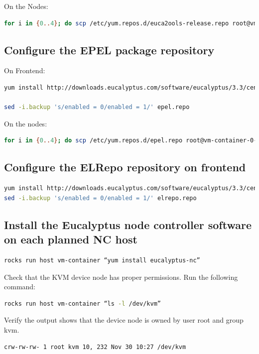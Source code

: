 On the Nodes:
\begin{lstlisting}[language=bash]
for i in {0..4}; do scp /etc/yum.repos.d/euca2ools-release.repo root@vm-container-0-$i:/etc/yum.repos.d/euca2ools-release.repo ; done
\end{lstlisting}

\subsection{Configure the EPEL package repository}
On Frontend:
\begin{lstlisting}[language=bash]
yum install http://downloads.eucalyptus.com/software/eucalyptus/3.3/centos/6/x86_64/epel-release-6.noarch.rpm

sed -i.backup 's/enabled = 0/enabled = 1/' epel.repo
\end{lstlisting}

On the nodes:
\begin{lstlisting}[language=bash]
for i in {0..4}; do scp /etc/yum.repos.d/epel.repo root@vm-container-0-$i:/etc/yum.repos.d/epel.repo ; done
\end{lstlisting}

\subsection{Configure the ELRepo repository on frontend}
\begin{lstlisting}[language=bash]
yum install http://downloads.eucalyptus.com/software/eucalyptus/3.3/centos/6/x86_64/elrepo-release-6.noarch.rpm
sed -i.backup 's/enabled = 0/enabled = 1/' elrepo.repo
\end{lstlisting}

\subsection{Install the Eucalyptus node controller software on each planned NC host}
\begin{lstlisting}[language=bash]
rocks run host vm-container “yum install eucalyptus-nc”
\end{lstlisting}

Check that the KVM device node has proper permissions.
Run the following command:
\begin{lstlisting}[language=bash]
rocks run host vm-container “ls -l /dev/kvm”
\end{lstlisting}
Verify the output shows that the device node is owned by user root and group kvm.
\begin{lstlisting}[language=bash]
crw-rw-rw- 1 root kvm 10, 232 Nov 30 10:27 /dev/kvm
\end{lstlisting}

